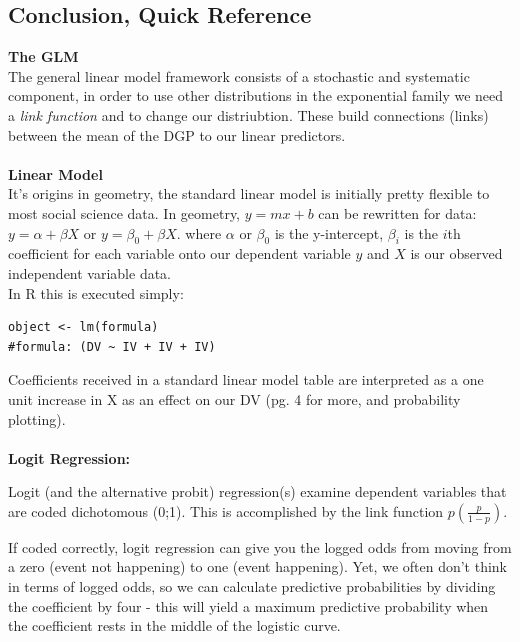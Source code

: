 \documentclass[12pt]{article}\usepackage[]{graphicx}\usepackage[]{color}
\begin{document}
\begin{flushleft}
\clearpage
\subsection{Conclusion, Quick Reference}

\textbf{The GLM}\\

The general linear model framework consists of a stochastic and systematic component, in order to use other distributions in the exponential family we need a \textit{link function} and to change our distriubtion. These build connections (links) between the mean of the DGP to our linear predictors.\\

\hfill \\
\noindent \textbf{Linear Model}\\
It's origins in geometry, the standard linear model is initially pretty flexible to most social science data. In geometry, $y=mx+b$ can be rewritten for data: $y=\alpha + \beta X$ or $y= \beta_0 + \beta X$. where $\alpha$ or $\beta_0$ is the y-intercept, $\beta_i$ is the $i$th coefficient for each variable onto our dependent variable $y$ and $X$ is our observed independent variable data. \\
In R this is executed simply:\\
\begin{verbatim}
object <- lm(formula)
#formula: (DV ~ IV + IV + IV)
\end{verbatim}

Coefficients received in a standard linear model table are interpreted as a one unit increase in X as an effect on our DV (pg. 4 for more, and probability plotting). \\

\hfill \\
\noindent \textbf{Logit Regression:}

Logit (and the alternative probit) regression(s) examine dependent variables that are coded dichotomous (0;1). This is accomplished by the link function $p\left(\frac{p}{1-p}\right)$.

 If coded correctly, logit regression can give you the logged odds from moving from a zero (event not happening) to one (event happening). Yet, we often don't think in terms of logged odds, so we can calculate predictive probabilities by dividing the coefficient by four - this will yield a maximum predictive probability when the coefficient rests in the middle of the logistic curve. \\


\end{flushleft}
\end{document}
